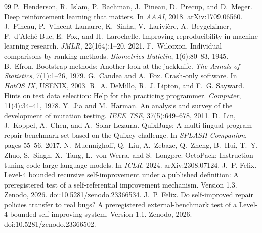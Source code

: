 \documentclass[11pt]{article}
\begin{document}
\begin{thebibliography}{99}
 P.~Henderson, R.~Islam, P.~Bachman, J.~Pineau, D.~Precup, and D.~Meger. Deep reinforcement learning that matters. In \emph{AAAI}, 2018. arXiv:1709.06560.
 J.~Pineau, P.~Vincent-Lamarre, K.~Sinha, V.~Larivi\`ere, A.~Beygelzimer, F.~d'Alch\'e-Buc, E.~Fox, and H.~Larochelle. Improving reproducibility in machine learning research. \emph{JMLR}, 22(164):1--20, 2021.
 F.~Wilcoxon. Individual comparisons by ranking methods. \emph{Biometrics Bulletin}, 1(6):80--83, 1945.
 B.~Efron. Bootstrap methods: Another look at the jackknife. \emph{The Annals of Statistics}, 7(1):1--26, 1979.
 G.~Candea and A.~Fox. Crash-only software. In \emph{HotOS IX}, USENIX, 2003.
 R.~A. DeMillo, R.~J. Lipton, and F.~G. Sayward. Hints on test data selection: Help for the practicing programmer. \emph{Computer}, 11(4):34--41, 1978.
 Y.~Jia and M.~Harman. An analysis and survey of the development of mutation testing. \emph{IEEE TSE}, 37(5):649--678, 2011.
 D.~Lin, J.~Koppel, A.~Chen, and A.~Solar-Lezama. QuixBugs: A multi-lingual program repair benchmark set based on the Quixey challenge. In \emph{SPLASH Companion}, pages 55--56, 2017.
 N.~Muennighoff, Q.~Liu, A.~Zebaze, Q.~Zheng, B.~Hui, T.~Y. Zhuo, S.~Singh, X.~Tang, L.~von Werra, and S.~Longpre. OctoPack: Instruction tuning code large language models. In \emph{ICLR}, 2024. arXiv:2308.07124.
 J.~P. Felix. Level-4 bounded recursive self-improvement under a published definition: A preregistered test of a self-referential improvement mechanism. Version 1.3. Zenodo, 2026. doi:10.5281/zenodo.23366534.
 J.~P. Felix. Do self-improved repair policies transfer to real bugs? A preregistered external-benchmark test of a Level-4 bounded self-improving system. Version 1.1. Zenodo, 2026. doi:10.5281/zenodo.23366502.
\end{thebibliography}
\end{document}
